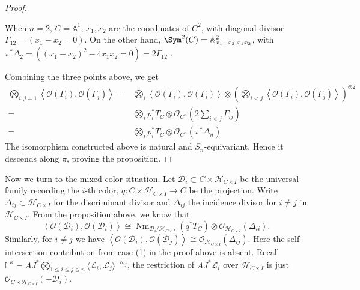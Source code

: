 \documentclass{amsart}
\numberwithin{equation}{section}
\numberwithin{figure}{section}
\theoremstyle{definition}
\theoremstyle{remark}
\renewcommand{\c}[1]{\mathcal{#1}}
\renewcommand{\b}[1]{\mathbb{#1}}
\begin{document}
\begin{proof}
\begin{enumerate}
When $n=2$, $C=\b A^1$, $x_1,x_2$ are the coordinates of $C^2$, with diagonal divisor $\Gamma_{12}=(x_1-x_2=0)$. On the other hand, $\Sym^2(C)=\b A^2_{x_1+x_2,x_1x_2}$, with  $\pi^*\Delta_2=\left((x_1+x_2)^2-4x_1x_2=0 \right)=2\Gamma_{12} $ .

\end{enumerate}
Combining the three points above, we get
\begin{align*}
\bigotimes_{i,j=1}\left\langle \c O(\Gamma_i), \c O(\Gamma_j)\right\rangle=&
\bigotimes_{i}\left\langle \c O(\Gamma_i), \c O(\Gamma_i)\right\rangle
\otimes
\left(\bigotimes_{i<j}\left\langle \c O(\Gamma_i), \c O(\Gamma_j)\right\rangle \right)^{\otimes2} \\
=&\bigotimes_{i} p_i^*T_C\otimes \c O_{C^n}\left( 2\sum_{i<j}\Gamma_{ij}\right) \\
=&\bigotimes_{i} p_i^*T_C\otimes \c O_{C^n}\left( \pi^*\Delta_n\right) 
\end{align*}
The isomorphism constructed above is natural and $S_n$-equivariant. Hence it descends along $\pi$, proving the proposition.
\end{proof}

Now we turn to the mixed color situation.
Let $\c D_i\subset C\times \c H_{C\times I}$ be the universal family recording the $i$-th color, $q: C\times \c H_{C\times I}\to C$ be the projection. Write $\Delta_{ij}\subset \c H_{C\times I}$ for the discriminant divisor and $\Delta_{ij}$ the incidence divisor for $i\neq j$ in $\c H_{C\times I}$. From the proposition above, we know that
$$\left\langle \c O(\c D_i),\c O(\c D_i)\right\rangle
\cong \operatorname{Nm}_{\mathcal D_i/\c H_{C\times I}}(q^*T_C)
\otimes\mathcal O_{\c H_{C\times I}}(\Delta_{ii}).$$
Similarly, for $i\neq j$ we have
$\left\langle \c O(\c D_i),\c O(\c D_j)\right\rangle
\cong \mathcal O_{\c H_{C\times I}}(\Delta_{ij}).$ Here the self-intersection contribution from case (1) in the proof above is absent.
Recall $\b L^\kappa= AJ^*\bigotimes_{1\le i\le j\le n}\langle \mathcal{L}_i,\mathcal{L}_j\rangle^{-\kappa_{ij}^\prime}$, the restriction of $AJ^*\c L_i$ over $\c H_{C\times I}$ is just $\c O_{C\times \c H_{C\times I}}(-\c D_i)$. 
\end{document}
